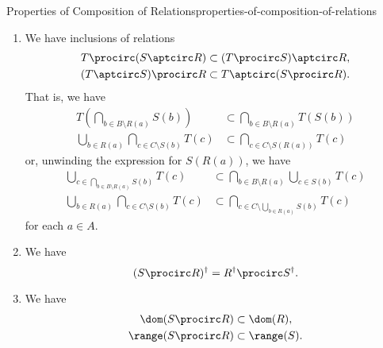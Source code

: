 \begin{proposition}{Properties of Composition of Relations}{properties-of-composition-of-relations}
\begin{enumerate}
\begin{align*}
                \bigcup_{a\in\{a\}}R(a)  &= R(a)
            \end{align*}
            for each $a\in A$.
        \item\label{properties-of-composition-of-relations-linear-distributivity}We have inclusions of relations
            \begin{align*}
                T\procirc(S\aptcirc R)  &\subset (T\procirc S)\aptcirc R,\\
                (T\aptcirc S)\procirc R &\subset T\aptcirc(S\procirc R).
            \end{align*}
            That is, we have
            \begin{align*}
                T(\bigcap_{b\in B\setminus R(a)}S(b))  &\subset \bigcap_{b\in B\setminus R(a)}T(S(b))\\
                \bigcup_{b\in R(a)}\bigcap_{c\in C\setminus S(b)}T(c) &\subset \bigcap_{c\in C\setminus S(R(a))}T(c)
            \end{align*}
            or, unwinding the expression for $S(R(a))$, we have
            \begin{align*}
                \bigcup_{c\in\bigcap_{b\in B\setminus R(a)}S(b)}T(c)  &\subset \bigcap_{b\in B\setminus R(a)}\bigcup_{c\in S(b)}T(c)\\
                \bigcup_{b\in R(a)}\bigcap_{c\in C\setminus S(b)}T(c) &\subset \bigcap_{c\in C\setminus\bigcup_{b\in R(a)}S(b)}T(c)
            \end{align*}
            for each $a\in A$.
        \item\label{properties-of-composition-of-relations-interaction-with-converses}We have
            \[
                (S\procirc R)^{\dagger}
                =
                R^{\dagger}\procirc S^{\dagger}.
            \]%
        \item\label{properties-of-composition-of-relations-interaction-with-ranges-and-domains}We have
            \begin{align*}
                \dom(S\procirc R)   &\subset \dom(R),\\
                \range(S\procirc R) &\subset \range(S).
            \end{align*}
    \end{enumerate}
\end{proposition}
